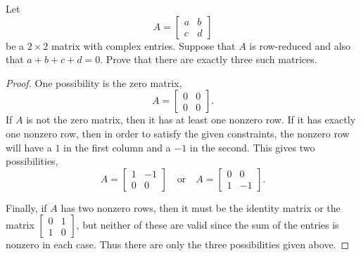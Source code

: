  Let
\begin{equation*}
  A =
  \begin{bmatrix}
    a & b \\
    c & d
  \end{bmatrix}
\end{equation*}
be a $2\times2$ matrix with complex entries. Suppose that $A$ is
row-reduced and also that $a + b + c + d = 0$. Prove that there are
exactly three such matrices.
\begin{proof}
  One possibility is the zero matrix,
  \begin{equation*}
    A =
    \begin{bmatrix}
      0 & 0 \\
      0 & 0
    \end{bmatrix}.
  \end{equation*}
  If $A$ is not the zero matrix, then it has at least one nonzero
  row. If it has exactly one nonzero row, then in order to satisfy the
  given constraints, the nonzero row will have a $1$ in the first
  column and a $-1$ in the second. This gives two possibilities,
  \begin{equation*}
    A =
    \begin{bmatrix}
      1 & -1 \\
      0 & 0
    \end{bmatrix}
    \quad\text{or}\quad
    A =
    \begin{bmatrix}
      0 & 0 \\
      1 & -1
    \end{bmatrix}.
  \end{equation*}

  Finally, if $A$ has two nonzero rows, then it must be the identity
  matrix or the matrix
  $\left[\begin{smallmatrix} 0 & 1 \\ 1 & 0 \end{smallmatrix}\right]$,
  but neither of these are valid since the sum of the entries is
  nonzero in each case. Thus there are only the three possibilities
  given above.
\end{proof}

